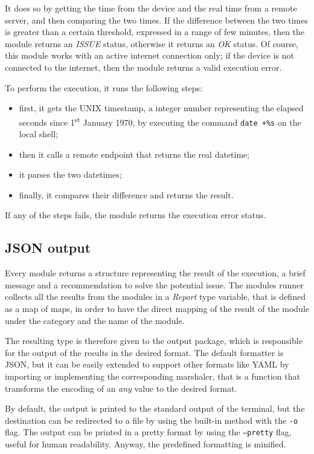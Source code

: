It does so by getting the time from the device and the real time from a remote server, and then comparing the two times. If the difference between the two times is greater than a certain threshold, expressed in a range of few minutes, then the module returns an \textit{ISSUE} status, otherwise it returns an \textit{OK} status. Of course, this module works with an active internet connection only; if the device is not connected to the internet, then the module returns a valid execution error.

To perform the execution, it runs the following steps:
\begin{itemize}
  \item first, it gets the UNIX timestamp, a integer number representing the elapsed seconds since 1\textsuperscript{st} January 1970, by executing the command \texttt{date +\%s} on the local shell;
  \item then it calls a remote endpoint that returns the real datetime;
  \item it parses the two datetimes;
  \item finally, it compares their difference and returns the result.
\end{itemize}

If any of the steps fails, the module returns the execution error status.


\subsection{JSON output}
\label{sec:json-output}

Every module returns a structure representing the result of the execution, a brief message and a recommendation to solve the potential issue. The modules runner collects all the results from the modules in a \textit{Report} type variable, that is defined as a map of maps, in order to have the direct mapping of the result of the module under the category and the name of the module.

The resulting type is therefore given to the output package, which is responsible for the output of the results in the desired format. The default formatter is JSON, but it can be easily extended to support other formats like YAML by importing or implementing the corresponding marshaler, that is a function that transforms the encoding of an \textit{any} value to the desired format.

By default, the output is printed to the standard output of the terminal, but the destination can be redirected to a file by using the built-in method with the \texttt{-o} flag. The output can be printed in a pretty format by using the \texttt{--pretty} flag, useful for human readability. Anyway, the predefined formatting is minified.

